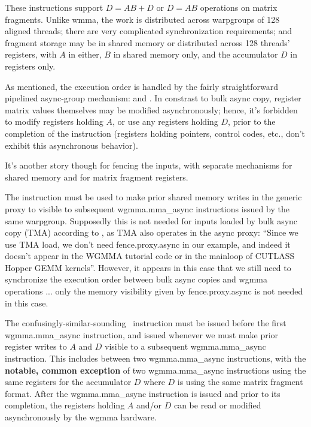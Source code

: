 These  instructions support $D = AB + D$ or $D = AB$ operations on matrix fragments. Unlike wmma, the work is distributed across warpgroups of 128 aligned threads; there are very complicated synchronization requirements; and fragment storage may be in shared memory or distributed across 128 threads' registers, with $A$ in either, $B$ in shared memory only, and the accumulator $D$ in registers only.

\filbreak
As mentioned, the execution order is handled by the fairly straightforward pipelined async-group mechanism:  and .
In constrast to bulk async copy, register matrix values themselves may be modified asynchronously; hence, it's forbidden to modify registers holding $A$, or use any registers holding $D$, prior to the completion of the instruction (registers holding pointers, control codes, etc., don't exhibit this asynchronous behavior).

\filbreak
It's another story though for fencing the inputs, with separate mechanisms for shared memory and for matrix fragment registers.

\filbreak
{} The  instruction must be used to make prior shared memory writes in the generic proxy to visible to subsequent wgmma.mma\_async instructions issued by the same warpgroup.
Supposedly this is not needed for inputs loaded by bulk async copy (TMA) according to , as TMA also operates in the async proxy: ``Since we use TMA load, we don’t need fence.proxy.async in our example, and indeed it doesn’t appear in the WGMMA tutorial code or in the mainloop of CUTLASS Hopper GEMM kernels''.
However, it appears in this case that we still need to synchronize the execution order between bulk async copies and wgmma operations ... only the memory visibility given by fence.proxy.async is not needed in this case.

\filbreak
{} The confusingly-similar-sounding \wgmmaFence\ instruction must be issued before the first wgmma.mma\_async instruction, and issued whenever we must make prior register writes to $A$ and $D$ visible to a subsequent wgmma.mma\_async instruction.
This includes between two wgmma.mma\_async instructions, with the \textbf{notable, common exception} of two wgmma.mma\_async instructions using the same registers for the accumulator $D$ where $D$ is using the same matrix fragment format.
After the wgmma.mma\_async instruction is issued and prior to its completion, the registers holding $A$ and/or $D$ can be read or modified asynchronously by the wgmma hardware.

